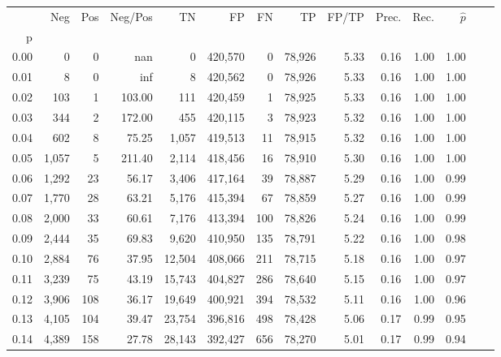 \begin{tabular}{rrrrrrrrrrrrrr}
\toprule
{} &    Neg &    Pos & Neg/Pos &       TN &       FP &      FN &      TP & FP/TP & Prec. &  Rec. & $\hat{p}$ \\
p    &        &        &         &          &          &         &         &       &       &       &           \\
\midrule
0.00 &      0 &      0 &     nan &        0 &  420,570 &       0 &  78,926 &  5.33 &  0.16 &  1.00 &      1.00 \\
0.01 &      8 &      0 &     inf &        8 &  420,562 &       0 &  78,926 &  5.33 &  0.16 &  1.00 &      1.00 \\
0.02 &    103 &      1 &  103.00 &      111 &  420,459 &       1 &  78,925 &  5.33 &  0.16 &  1.00 &      1.00 \\
0.03 &    344 &      2 &  172.00 &      455 &  420,115 &       3 &  78,923 &  5.32 &  0.16 &  1.00 &      1.00 \\
0.04 &    602 &      8 &   75.25 &    1,057 &  419,513 &      11 &  78,915 &  5.32 &  0.16 &  1.00 &      1.00 \\
0.05 &  1,057 &      5 &  211.40 &    2,114 &  418,456 &      16 &  78,910 &  5.30 &  0.16 &  1.00 &      1.00 \\
0.06 &  1,292 &     23 &   56.17 &    3,406 &  417,164 &      39 &  78,887 &  5.29 &  0.16 &  1.00 &      0.99 \\
0.07 &  1,770 &     28 &   63.21 &    5,176 &  415,394 &      67 &  78,859 &  5.27 &  0.16 &  1.00 &      0.99 \\
0.08 &  2,000 &     33 &   60.61 &    7,176 &  413,394 &     100 &  78,826 &  5.24 &  0.16 &  1.00 &      0.99 \\
0.09 &  2,444 &     35 &   69.83 &    9,620 &  410,950 &     135 &  78,791 &  5.22 &  0.16 &  1.00 &      0.98 \\
0.10 &  2,884 &     76 &   37.95 &   12,504 &  408,066 &     211 &  78,715 &  5.18 &  0.16 &  1.00 &      0.97 \\
0.11 &  3,239 &     75 &   43.19 &   15,743 &  404,827 &     286 &  78,640 &  5.15 &  0.16 &  1.00 &      0.97 \\
0.12 &  3,906 &    108 &   36.17 &   19,649 &  400,921 &     394 &  78,532 &  5.11 &  0.16 &  1.00 &      0.96 \\
0.13 &  4,105 &    104 &   39.47 &   23,754 &  396,816 &     498 &  78,428 &  5.06 &  0.17 &  0.99 &      0.95 \\
0.14 &  4,389 &    158 &   27.78 &   28,143 &  392,427 &     656 &  78,270 &  5.01 &  0.17 &  0.99 &      0.94 \\

\end{tabular}
